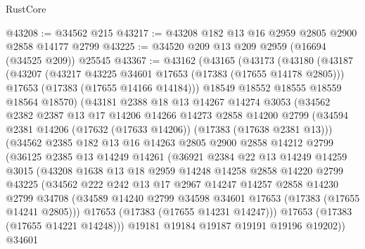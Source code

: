 \begin{lexlean}{RustCore}
\begin{coremodule}
@43208 := @34562 @215
@43217 := @43208 @182 @13 @16 @2959 @2805 @2900 @2858 @14177 @2799
@43225 := @34520 @209 @13 @209 @2959 (@16694 (@34525 @209)) @25545
@43367 := @43162
    (@43165
      (@43173
        (@43180
          (@43187
            (@43207
              (@43217 @43225 @34601 @17653 (@17383 (@17655 @14178 @2805)))
              @17653
              (@17383 (@17655 @14166 @14184)))
            @18549
            @18552
            @18555
            @18559
            @18564
            @18570)
          (@43181
            @2388
            @18
            @13
            @14267
            @14274
            @3053
            (@34562
              @2382
              @2387
              @13
              @17
              @14206
              @14266
              @14273
              @2858
              @14200
              @2799
              (@34594 @2381 @14206 (@17632 (@17633 @14206)) (@17383 (@17638 @2381 @13)))
              (@34562
                @2385
                @182
                @13
                @16
                @14263
                @2805
                @2900
                @2858
                @14212
                @2799
                (@36125
                  @2385
                  @13
                  @14249
                  @14261
                  (@36921
                    @2384
                    @22
                    @13
                    @14249
                    @14259
                    @3015
                    (@43208
                      @1638
                      @13
                      @18
                      @2959
                      @14248
                      @14258
                      @2858
                      @14220
                      @2799
                      @43225
                      (@34562
                        @222
                        @242
                        @13
                        @17
                        @2967
                        @14247
                        @14257
                        @2858
                        @14230
                        @2799
                        @34708
                        (@34589 @14240 @2799 @34598 @34601 @17653 (@17383 (@17655 @14241 @2805)))
                        @17653
                        (@17383 (@17655 @14231 @14247)))
                      @17653
                      (@17383 (@17655 @14221 @14248)))
                    @19181
                    @19184
                    @19187
                    @19191
                    @19196
                    @19202))
                @34601

\end{coremodule}
\end{lexlean}
